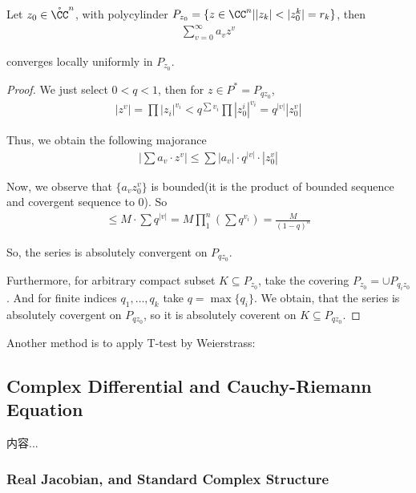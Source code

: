\documentclass[Total.tex]{subfiles}
\begin{document}
					\begin{proposition}
						Let $z_0\in \mathring{\CC}^n$, with polycylinder $P_{z_0}=\{z\in \CC^n||z_k|<|z_0^k|=r_k\}$, then
						\begin{gather*}
							\sum_{v=0}^\infty a_v z^v
						\end{gather*}
						
						converges locally uniformly in $P_{z_0}$.
					\end{proposition}
					\begin{proof}
						We just select $0<q<1$, then for $z\in P^*=P_{qz_0}$,
						\begin{gather*}
							|z^v|=\prod |z_i|^{v_i}<q^{\sum v_i} \prod |z_0^i|^{v_i}=q^{|v|}|z_0^v|
						\end{gather*}
						
						Thus, we obtain the following majorance
						\begin{gather*}
							|\sum a_v\cdot z^v|\leq \sum |a_v|\cdot q^{|v|}\cdot |z_0^v|
						\end{gather*}
						
						Now, we observe that $\{a_v z_0^v\}$ is bounded(it is the product of bounded sequence and covergent sequence to 0). So
						\begin{gather*}
							\leq M\cdot \sum q^{|v|}=M\prod_1^n (\sum q^{v_i})= \frac{M}{(1-q)^n}
						\end{gather*}
						
						So, the series is absolutely convergent on $P_{qz_0}$.
						
						Furthermore, for arbitrary compact subset $K\subseteq P_{z_0}$, take the covering $P_{z_0}=\cup P_{q_iz_0}$. And for finite indices $q_1,\dots,q_k$ take $q=\max\{q_i\}$. We obtain, that the series is absolutely covergent on $P_{qz_0}$, so it is absolutely coverent on $K\subseteq P_{qz_0}$.
					\end{proof}
					
					Another method is to apply T-test by Weierstrass:

		
			\subsection{Complex Differential and Cauchy-Riemann Equation}
				\begin{Def}
					内容...
				\end{Def}
				\subsubsection{Real Jacobian, and Standard Complex Structure}
				
\end{document}
